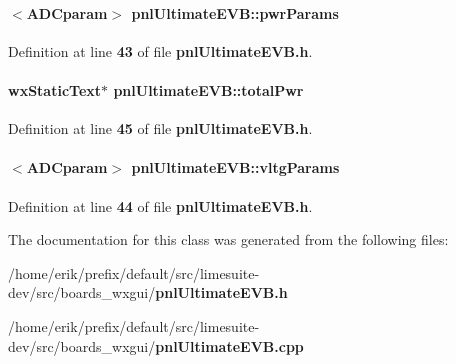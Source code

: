 \paragraph[{pwr\+Params}]{$<${\bf A\+D\+Cparam}$>$ pnl\+Ultimate\+E\+V\+B\+::pwr\+Params\hspace{0.3cm}{\ttfamily [protected]}}\label{classpnlUltimateEVB_acee3bd603f7fdb5b4af2bc341a212869}


Definition at line {\bf 43} of file {\bf pnl\+Ultimate\+E\+V\+B.\+h}.

\paragraph[{total\+Pwr}]{\setlength{\rightskip}{0pt plus 5cm}wx\+Static\+Text$\ast$ pnl\+Ultimate\+E\+V\+B\+::total\+Pwr\hspace{0.3cm}{\ttfamily [protected]}}\label{classpnlUltimateEVB_ab93b06b8bce8dd3b32b1aee8dbf48931}


Definition at line {\bf 45} of file {\bf pnl\+Ultimate\+E\+V\+B.\+h}.

\paragraph[{vltg\+Params}]{$<${\bf A\+D\+Cparam}$>$ pnl\+Ultimate\+E\+V\+B\+::vltg\+Params\hspace{0.3cm}{\ttfamily [protected]}}\label{classpnlUltimateEVB_af21dfc7a3fc333f3df8f718e5769eeb5}


Definition at line {\bf 44} of file {\bf pnl\+Ultimate\+E\+V\+B.\+h}.



The documentation for this class was generated from the following files\+:\begin{DoxyCompactItemize}
\item 
/home/erik/prefix/default/src/limesuite-\/dev/src/boards\+\_\+wxgui/{\bf pnl\+Ultimate\+E\+V\+B.\+h}\item 
/home/erik/prefix/default/src/limesuite-\/dev/src/boards\+\_\+wxgui/{\bf pnl\+Ultimate\+E\+V\+B.\+cpp}\end{DoxyCompactItemize}
